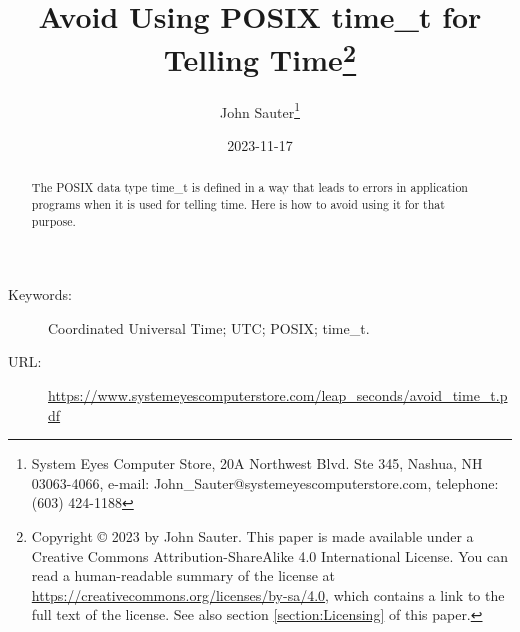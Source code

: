 \documentclass[letterpaper,twoside]{article}
\begin{document}
\title{Avoid Using POSIX {\ttfamily time\_t} for Telling
  Time\footnote{Copyright
    {\copyright} 2023 by John Sauter.
    This paper is made available under a
    Creative Commons Attribution-ShareAlike 4.0 International License.
    You can read a human-readable summary of the license at
    \href{https://creativecommons.org/licenses/by-sa/4.0}{https://creativecommons.org/licenses/by-sa/4.0},
    which contains a link to the full text of the license.
    See also section \ref{section:Licensing} of this paper.}
}
\author{John Sauter\footnote{
    System Eyes Computer Store,
    20A Northwest Blvd.  Ste 345,
    Nashua, NH  03063-4066,
    e-mail: John\_Sauter@systemeyescomputerstore.com,
    telephone: (603) 424-1188}}

\date{2023-11-17}
\maketitle
\begin{abstract}
  The POSIX data type {\ttfamily time\_t} is defined in a way that leads
  to errors in application programs when it is used for telling time.
  Here is how to avoid using it for that purpose.
\end{abstract}
\begin{description}
\item[Keywords:]Coordinated Universal Time; UTC; POSIX; time\_t.
\item[URL:]\href{https://www.systemeyescomputerstore.com/leap\_seconds/avoid\_time\_t.pdf}{https://www.systemeyescomputerstore.com/leap\_seconds/avoid\_time\_t.pdf}
\end{description}
\newpage
\end{document}
